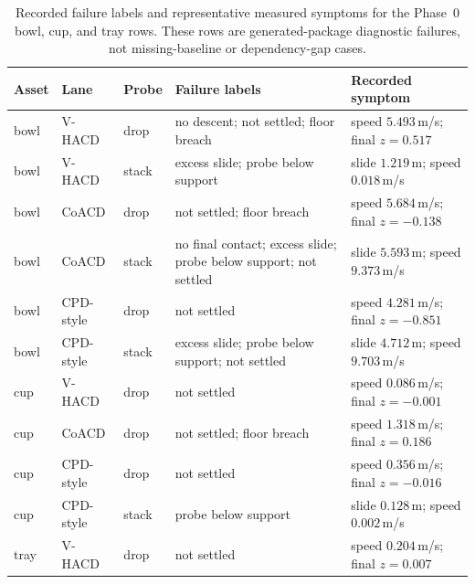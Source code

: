 \begin{table}[!htbp]
  \centering
  \scriptsize
  \setlength{\tabcolsep}{2.2pt}
  \renewcommand{\arraystretch}{0.92}
  \begin{tabular}{@{}>{\raggedright\arraybackslash}p{}>{\raggedright\arraybackslash}p{}>{\raggedright\arraybackslash}p{}>{\raggedright\arraybackslash}p{}>{\raggedright\arraybackslash}p{}@{}}
    \toprule
    Asset & Lane & Probe & Failure labels & Recorded symptom \\
    \midrule
    bowl & V-HACD & drop & no descent; not settled; floor breach & speed $5.493$\,m/s; final $z=0.517$ \\
    bowl & V-HACD & stack & excess slide; probe below support & slide $1.219$\,m; speed $0.018$\,m/s \\
    bowl & CoACD & drop & not settled; floor breach & speed $5.684$\,m/s; final $z=-0.138$ \\
    bowl & CoACD & stack & no final contact; excess slide; probe below support; not settled & slide $5.593$\,m; speed $9.373$\,m/s \\
    bowl & CPD-style & drop & not settled & speed $4.281$\,m/s; final $z=-0.851$ \\
    bowl & CPD-style & stack & excess slide; probe below support; not settled & slide $4.712$\,m; speed $9.703$\,m/s \\
    cup & V-HACD & drop & not settled & speed $0.086$\,m/s; final $z=-0.001$ \\
    cup & CoACD & drop & not settled; floor breach & speed $1.318$\,m/s; final $z=0.186$ \\
    cup & CPD-style & drop & not settled & speed $0.356$\,m/s; final $z=-0.016$ \\
    cup & CPD-style & stack & probe below support & slide $0.128$\,m; speed $0.002$\,m/s \\
    tray & V-HACD & drop & not settled & speed $0.204$\,m/s; final $z=0.007$ \\
    \bottomrule
  \end{tabular}
  \caption{Recorded failure labels and representative measured symptoms for the Phase~0 bowl, cup, and tray rows. These rows are generated-package diagnostic failures, not missing-baseline or dependency-gap cases.}
  \label{tab:phase0-failure-labels}
\end{table}

\FloatBarrier

